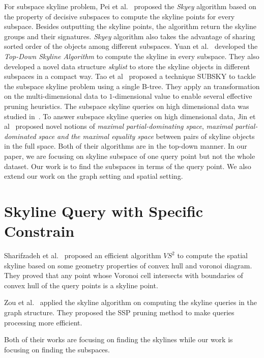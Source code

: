 For subspace skyline problem, Pei et al.~\cite{pei2005catching} proposed the \emph{Skyey} algorithm based on the property of decisive subspaces to compute the skyline points for every subspace. Besides outputting the skyline points, the algorithm return the skyline groups and their signatures. \emph{Skyey} algorithm also takes the advantage of sharing sorted order of the objects among different subspaces. Yuan et al.~\cite{yuan2005efficient} developed the \emph{Top-Down Skyline Algorithm} to compute the skyline in every subspace. They also developed a novel data structure \emph{skylist} to store the skyline objects in different subspaces in a compact way. 
Tao et al~\cite{tao2006subsky} proposed a technique SUBSKY to tackle the subspace skyline problem using a single B-tree. They apply an transformation on the multi-dimensional data to $1$-dimensional value to enable several effective pruning heuristics.
The subspace skyline queries on high dimensional data was studied in~\cite{jin2007efficient}. To answer subspace skyline queries on high dimensional data, Jin et al~\cite{jin2007efficient} proposed novel notions of \emph{maximal partial-dominating space}, \emph{maximal partial-dominated space and the maximal equality space} between pairs of skyline objects in the full space. Both of their algorithms are in the top-down manner. In our paper, we are focusing on skyline subspace of one query point but not the whole dataset. Our work is to find the subspaces in terms of the query point. We also extend our work on the graph setting and spatial setting.

\section{Skyline Query with Specific Constrain}
\label{sec:rel:constrain}

Sharifzadeh et al.~\cite{sharifzadeh2006spatial} proposed an efficient algorithm $VS^2$ to compute the spatial skyline based on some geometry properties of convex hull and voronoi diagram. They proved that any point whose Voronoi cell intersects with boundaries of convex hull of the query points is a skyline point.

Zou et al.~\cite{zou2010dynamic} applied the skyline algorithm on computing the skyline queries in the graph structure. They proposed the SSP pruning method to make queries processing more efficient.

Both of their works are focusing on finding the skylines while our work is focusing on finding the subspaces.




